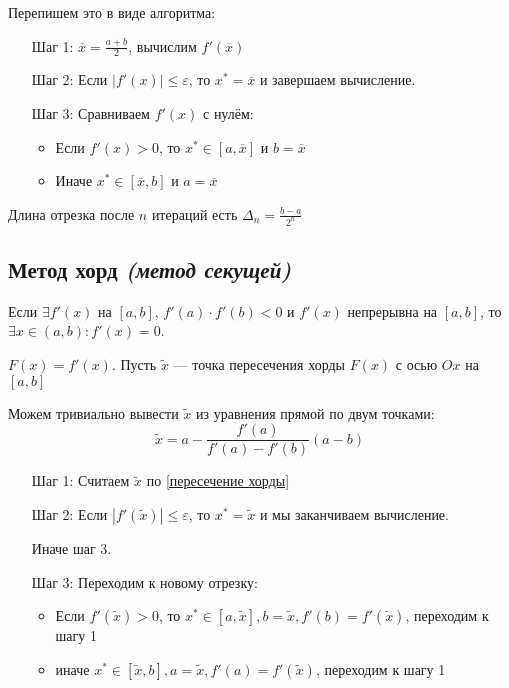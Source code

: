 \documentclass[12pt, a4paper, oneside]{book}
\begin{document}
Перепишем это в виде алгоритма:

\begin{itemize}
    \item [Шаг 1:] \(\overline x = \frac{a + b}{2}\), вычислим \(f'(\overline x)\)
    \item [Шаг 2:] Если \(|f'(x)| \leq \varepsilon\), то \(x^* = \overline x\) и завершаем вычисление.
    \item [Шаг 3:] Сравниваем \(f'(x)\) с нулём: \begin{itemize}
              \item Если \(f'(x) > 0\), то \(x^*\in[a, \overline x]\) и \(b = \overline x\)
              \item Иначе \(x^*\in[\overline x, b]\) и \(a = \overline x\)
          \end{itemize}
\end{itemize}

Длина отрезка после \(n\) итераций есть \(\Delta_n = \frac{b - a}{2^n}\)

\subsection{Метод хорд \textit{(метод секущей)}}

Если \(\exists f'(x)\) на \([a, b]\), \(f'(a) \cdot f'(b) < 0\) и \(f'(x)\) непрерывна на \([a, b]\), то \(\exists x\in(a, b) : f'(x) = 0\).

\(F(x) = f'(x)\). Пусть \(\tilde{x}\) --- точка пересечения хорды \(F(x)\) с осью \(Ox\) на \([a, b]\)

\begin{figure}[h]
    \centering
    
\end{figure}

Можем тривиально вывести \(\tilde{x}\) из уравнения прямой по двум точками:
\begin{equation}
    \tilde{x} = a - \frac{f'(a)}{f'(a) - f'(b)}(a - b) \label{пересечение хорды}
\end{equation}

\begin{itemize}
    \item [Шаг 1:] Считаем \(\tilde{x}\) по \eqref{пересечение хорды}
    \item [Шаг 2:] Если \(|f'(\tilde{x})| \leq \varepsilon\), то \(x^* = \tilde{x}\) и мы заканчиваем вычисление.

          Иначе шаг 3.
    \item [Шаг 3:] Переходим к новому отрезку:
          \begin{itemize}
              \item Если \(f'(\tilde{x}) > 0\), то \(x^* \in [a, \tilde{x}], b = \tilde{x}, f'(b) = f'(\tilde{x})\), переходим к шагу 1
              \item иначе \(x^* \in [\tilde{x}, b], a = \tilde{x}, f'(a) = f'(\tilde{x})\), переходим к шагу 1
          \end{itemize}
\end{itemize}
\end{document}
